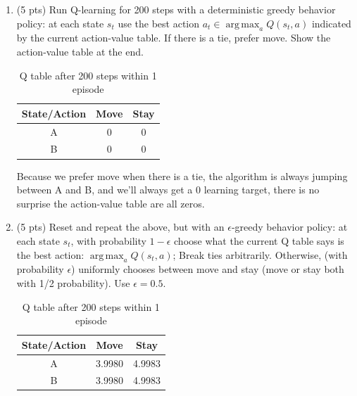 \documentclass[a4paper]{article}
\theoremstyle{definition}
\DeclareMathOperator*{\argmax}{arg\,max}
\newenvironment{soln}{
    \leavevmode\color{blue}\ignorespaces
}{}
\begin{document}
\begin{enumerate}
	\item (5 pts) Run Q-learning for 200 steps with a deterministic greedy behavior policy: at each state $s_t$ use the best action $a_t \in \argmax_a Q(s_t,a)$ indicated by the current action-value table. If there is a tie, prefer move. Show the action-value table at the end.

	      \begin{soln}
		      \begin{table}[!h]
			      \begin{center}
				      \begin{tabular}{ccc}
					      State/Action & Move & Stay \\\hline
					      A            & 0    & 0    \\
					      B            & 0    & 0
				      \end{tabular}
				      \caption*{Q table after 200 steps within 1 episode}
			      \end{center}
		      \end{table}

					Because we prefer move when there is a tie, the algorithm is always jumping between A and B, and we'll always get a 0 learning target, there is no surprise the action-value table are all zeros.
	      \end{soln}

	\item (5 pts) Reset and repeat the above, but with an $\epsilon$-greedy behavior policy: at each state $s_t$, with probability $1-\epsilon$ choose what the current Q table says is the best action: $\argmax_a Q(s_t,a)$; Break ties arbitrarily. Otherwise, (with probability $\epsilon$) uniformly chooses between move and stay (move or stay both with 1/2 probability). Use $\epsilon=0.5$.

	      \begin{soln}
		      \begin{table}[!h]
			      \begin{center}
				      \begin{tabular}{ccc}
					      State/Action & Move & Stay \\\hline
					      A            & 3.9980    & 4.9983    \\
					      B            & 3.9980    & 4.9983
				      \end{tabular}
				      \caption*{Q table after 200 steps within 1 episode}
			      \end{center}
		      \end{table}
					\end{soln}


\end{enumerate}
\end{document}
